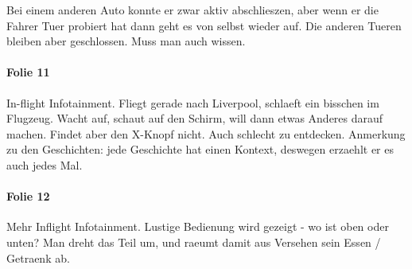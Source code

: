Bei einem anderen Auto konnte er zwar aktiv abschlieszen, aber wenn er die Fahrer
Tuer probiert hat dann geht es von selbst wieder auf. Die anderen Tueren bleiben
aber geschlossen. Muss man auch wissen.

\paragraph{Folie 11}
In-flight Infotainment. 
Fliegt gerade nach Liverpool, schlaeft ein bisschen im Flugzeug. Wacht auf, schaut
auf den Schirm, will dann etwas Anderes darauf machen. Findet aber den X-Knopf
nicht. Auch schlecht zu entdecken.
Anmerkung zu den Geschichten: jede Geschichte hat einen Kontext, deswegen erzaehlt
er es auch jedes Mal.

\paragraph{Folie 12}
Mehr Inflight Infotainment. Lustige Bedienung wird gezeigt - wo ist oben oder unten?
Man dreht das Teil um, und raeumt damit aus Versehen sein Essen / Getraenk ab. 
